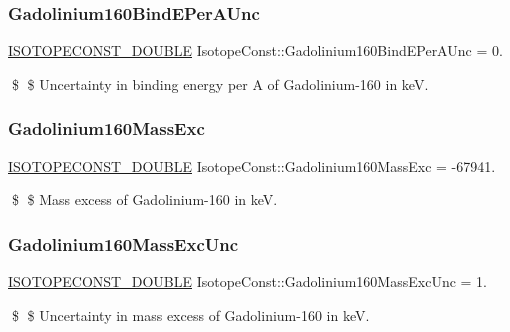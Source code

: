 \subsubsection{\texorpdfstring{Gadolinium160\+Bind\+E\+Per\+A\+Unc}{Gadolinium160BindEPerAUnc}}
{\footnotesize\ttfamily \mbox{\hyperlink{group___isotope_const-_macros_ga8f45a7272ce02c0b4c65c44636ed719a}{I\+S\+O\+T\+O\+P\+E\+C\+O\+N\+S\+T\+\_\+\+D\+O\+U\+B\+LE}} Isotope\+Const\+::\+Gadolinium160\+Bind\+E\+Per\+A\+Unc = 0.}

\$ \$ Uncertainty in binding energy per A of Gadolinium-\/160 in keV. \mbox{\label{group___isotope_const-_gadolinium-_gd160_gafe51a47096fe60de46cb839149bbd6ce}} 
\subsubsection{\texorpdfstring{Gadolinium160\+Mass\+Exc}{Gadolinium160MassExc}}
{\footnotesize\ttfamily \mbox{\hyperlink{group___isotope_const-_macros_ga8f45a7272ce02c0b4c65c44636ed719a}{I\+S\+O\+T\+O\+P\+E\+C\+O\+N\+S\+T\+\_\+\+D\+O\+U\+B\+LE}} Isotope\+Const\+::\+Gadolinium160\+Mass\+Exc = -\/67941.}

\$ \$ Mass excess of Gadolinium-\/160 in keV. \mbox{\label{group___isotope_const-_gadolinium-_gd160_gae4dc2c77ddbf20cf3a1510212d1e59d7}} 
\subsubsection{\texorpdfstring{Gadolinium160\+Mass\+Exc\+Unc}{Gadolinium160MassExcUnc}}
{\footnotesize\ttfamily \mbox{\hyperlink{group___isotope_const-_macros_ga8f45a7272ce02c0b4c65c44636ed719a}{I\+S\+O\+T\+O\+P\+E\+C\+O\+N\+S\+T\+\_\+\+D\+O\+U\+B\+LE}} Isotope\+Const\+::\+Gadolinium160\+Mass\+Exc\+Unc = 1.}

\$ \$ Uncertainty in mass excess of Gadolinium-\/160 in keV. \mbox{\label{group___isotope_const-_gadolinium-_gd160_ga301b68f7c9824bfa24c73178055573cf}} 
